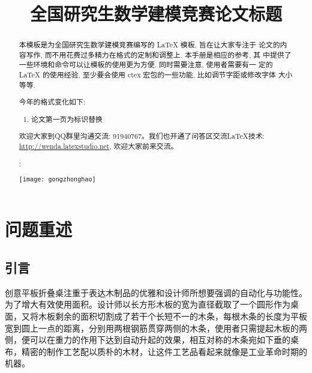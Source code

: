 \documentclass[bwprint]{gmcmthesis}
\title{全国研究生数学建模竞赛论文标题}
\begin{document}
	\maketitle
	
	\begin{abstract}
		本模板是为全国研究生数学建模竞赛编写的 \LaTeX{} 模板, 旨在让大家专注于
		论文的内容写作, 而不用花费过多精力在格式的定制和调整上. 本手册是相应的参考, 其
		中提供了一些环境和命令可以让模板的使用更为方便. 同时需要注意, 使用者需要有一
		定的 \LaTeX{} 的使用经验, 至少要会使用 ctex 宏包的一些功能, 比如调节字距或修改字体
		大小等等.
		\begin{mdframed} [%
			roundcorner=5pt,
			linecolor=gray!50,
			outerlinewidth=0.5pt,
			middlelinewidth=0.3pt, backgroundcolor=gray!2,
			innertopmargin=\topskip, frametitle={2020年格式变化说明},
			frametitlefont= \bfseries,frametitlerule=true,frametitlealignment =\raggedright\noindent,
			frametitlerulewidth=.5pt, frametitlebackgroundcolor=gray!2,
			]
			今年的格式变化如下:
			\begin{enumerate}
				\item 论文第一页为标识替换
			\end{enumerate}
		\end{mdframed}
		欢迎大家到QQ群里沟通交流: 91940767。我们也开通了问答区交流\LaTeX{}技术: \url{http://wenda.latexstudio.net}, 欢迎大家前来交流。
		
		:
		
		\centerline{\texttt{[image: gongzhonghao]}}
		
	\end{abstract}	

	\section{问题重述}
		
		\subsection{引言}
		创意平板折叠桌注重于表达木制品的优雅和设计师所想要强调的自动化与功能性\cite{mittelbach_latex_2004}。为了增大有效使用面积。设计师以长方形木板的宽为直径截取了一个圆形作为桌面，又将木板剩余的面积切割成了若干个长短不一的木条，每根木条的长度为平板宽到圆上一点的距离，分别用两根钢筋贯穿两侧的木条，使用者只需提起木板的两侧，便可以在重力的作用下达到自动升起的效果，\cite{wright_latex3_2009}相互对称的木条宛如下垂的桌布，精密的制作工艺配以质朴的木材，让这件工艺品看起来就像是工业革命时期的机器。
		
\end{document}
